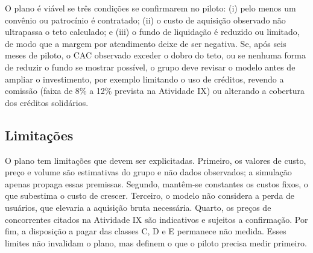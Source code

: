 O plano é viável se três condições se confirmarem no piloto: (i) pelo menos um convênio ou patrocínio é contratado; (ii) o custo de aquisição observado não ultrapassa o teto calculado; e (iii) o fundo de liquidação é reduzido ou limitado, de modo que a margem por atendimento deixe de ser negativa. Se, após seis meses de piloto, o CAC observado exceder o dobro do teto, ou se nenhuma forma de reduzir o fundo se mostrar possível, o grupo deve revisar o modelo antes de ampliar o investimento, por exemplo limitando o uso de créditos, revendo a comissão (faixa de 8\% a 12\% prevista na Atividade IX) ou alterando a cobertura dos créditos solidários.

\subsection{Limitações}

O plano tem limitações que devem ser explicitadas. Primeiro, os valores de custo, preço e volume são estimativas do grupo e não dados observados; a simulação apenas propaga essas premissas. Segundo, mantêm-se constantes os custos fixos, o que subestima o custo de crescer. Terceiro, o modelo não considera a perda de usuários, que elevaria a aquisição bruta necessária. Quarto, os preços de concorrentes citados na Atividade IX são indicativos e sujeitos a confirmação. Por fim, a disposição a pagar das classes C, D e E permanece não medida. Esses limites não invalidam o plano, mas definem o que o piloto precisa medir primeiro.
